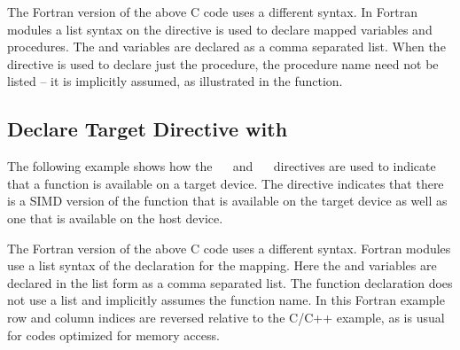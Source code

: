 
The Fortran version of the above C code uses a different syntax. In Fortran modules 
a list syntax on the   directive is used to declare 
mapped variables and procedures. The  and  variables are declared as a comma 
separated list. When the   directive is used to 
declare just the procedure, the procedure name need not be listed -- it is implicitly 
assumed, as illustrated in the  function.


\subsection{Declare Target Directive with ~}
\label{subsec:declare_target_simd}




The following example shows how the ~~ and 
~~ directives are used to indicate that a function 
is available on a target device. The   directive indicates 
that there is a SIMD version of the function  that is available on the target 
device as well as one that is available on the host device.


The Fortran version of the above C code uses a different syntax. Fortran modules 
use a list syntax of the   declaration for the mapping. 
Here the  and  variables are declared in the list form as a comma separated list. 
The function declaration does not use a list and implicitly assumes the function 
name. In this Fortran example row and column indices are reversed relative to the 
C/C++ example, as is usual for codes optimized for memory access.



